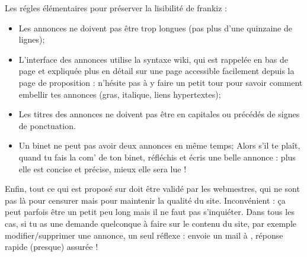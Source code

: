 Les régles élémentaires pour préserver la lisibilité de frankiz :
\begin{itemize}
 \item Les annonces ne doivent pas être trop longues (pas plus d'une quinzaine de lignes);
 \item L'interface des annonces utilise la syntaxe wiki, qui est rappelée en bas de page et expliquée plus en détail
        sur une page accessible facilement depuis la page de proposition :
        n'hésite pas à y faire un petit tour pour savoir comment embellir tes annonces
        (gras, italique, liens hypertextes);
 \item Les titres des annonces ne doivent pas être en capitales ou précédés de signes de ponctuation.
 \item Un binet ne peut pas avoir deux annonces en même temps;
       Alors s'il te plaît, quand tu fais la com' de ton binet, réfléchis et écris une belle annonce :
       plus elle est concise et précise, mieux elle sera lue !
\end{itemize}

Enfin, tout ce qui est proposé sur \fkz doit être validé par les
webmestres, qui ne sont pas là pour censurer mais pour maintenir la
qualité du site. Inconvénient : ça peut parfois être un petit peu
long mais il ne faut pas s'inquiéter. Dans tous les cas, si tu as une
demande quelconque à faire sur le contenu du site, par exemple
modifier/supprimer une annonce, un seul réflexe : envoie un mail à
, réponse rapide (presque) assurée !
